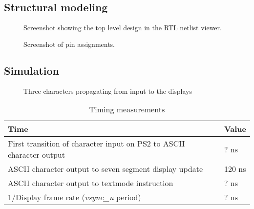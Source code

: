 \documentclass[12pt,a4paper,titlepage,oneside]{article}
\begin{document}
\maketitle

\subsection*{Structural modeling}
\begin{figure}[ht!]
  \centering
  \caption{Screenshot showing the top level design in the RTL netlist viewer.}
\end{figure}

\begin{figure}[ht!]
  \centering
  \caption{Screenshot of pin assignments.}
\end{figure}

\newpage
\subsection*{Simulation}

\begin{figure}[ht!]
  \centering
  \caption{Three characters propagating from input to the displays}
\end{figure}

\begin{table}[ht!]
  \centering
  \caption{Timing measurements}
  \begin{tabular}{|l|l|}
    \hline
    Time                                                                 & Value  \\ \hline 
    First transition of character input on PS2 to ASCII character output & ? ns   \\
    ASCII character output to seven segment display update               & 120 ns   \\
    ASCII character output to textmode instruction                       & ? ns   \\
    1/Display frame rate (\emph{vsync\_n} period)                        & ? ns   \\ \hline
  \end{tabular}
\end{table}
\end{document}
